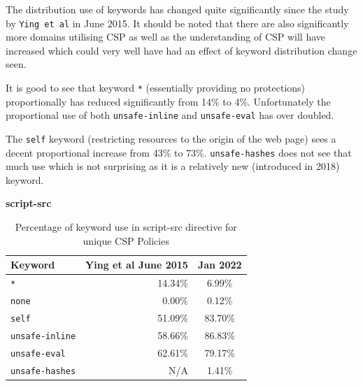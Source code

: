 \documentclass{mscreport}
\begin{document}
\clearpage
\newpage

\noindent
The distribution use of keywords has changed quite significantly since the study by \texttt{Ying et al} \cite{Ying2016-ag} in June 2015. It should be noted that there are also significantly more domains utilising CSP as well as the understanding of CSP will have increased which could very well have had an effect of keyword distribution change seen.

\vspace{0.3cm} \noindent
It is good to see that keyword \texttt{*} (essentially providing no protections) proportionally has reduced significantly from 14\% to 4\%. Unfortunately the proportional use of both \texttt{unsafe-inline} and \texttt{unsafe-eval} has over doubled.

\vspace{0.3cm} \noindent
The \texttt{self} keyword (restricting resources to the origin of the web page) sees a decent proportional increase from 43\% to 73\%. \texttt{unsafe-hashes} does not see that much use which is not surprising as it is a relatively new (introduced in 2018) keyword.

\vspace{0.7cm} \noindent
\textbf{script-src}

\begin{table}[H]
  \begin{center}
    \begin{tabular}{|l|D|c|}  %
      \hline
      \textbf{Keyword} & \textbf{Ying et al} \cite{Ying2016-ag} June 2015 & Jan 2022 \\
      \hline
      \texttt{*} & 14.34\% & 6.99\%\\
      \hline
      \texttt{none} & 0.00\% & 0.12\%\\
      \hline
      \texttt{self} & 51.09\% & 83.70\%\\
      \hline
      \texttt{unsafe-inline} & 58.66\% & 86.83\%\\
      \hline
      \texttt{unsafe-eval} & 62.61\% & 79.17\%\\
      \hline
      \texttt{unsafe-hashes} & N/A & 1.41\%\\
      \hline
    \end{tabular}
    \caption{Percentage of keyword use in script-src directive for unique CSP Policies}
    \label{table:csp_script-src-keyword}  %
  \end{center}
\end{table}
\end{document}
